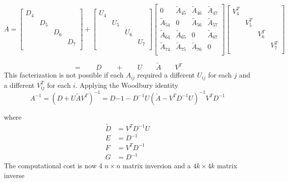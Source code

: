 \begin{equation*}
    A =
    \begin{bmatrix}
        D_4    & & & \\
        & D_5    & & \\
        & & D_6    & \\
        & & & D_7    \\
    \end{bmatrix}
    +
    \begin{bmatrix}
        U_4    & & & \\
        & U_5    & & \\
        & & U_6    & \\
        & & & U_7    \\
    \end{bmatrix}
    \begin{bmatrix}
        0    & \widetilde{A}_{45} & \widetilde{A}_{46} & \widetilde{A}_{47} \\
        \widetilde{A}_{54} & 0 & \widetilde{A}_{56} & \widetilde{A}_{57} \\
        \widetilde{A}_{64} & \widetilde{A}_{65} & 0 & \widetilde{A}_{67} \\
        \widetilde{A}_{74} & \widetilde{A}_{75} & \widetilde{A}_{76} &    0 \\
    \end{bmatrix}
    \begin{bmatrix}
        V^T_4    & & & \\
        & V^T_5    & & \\
        & & V^T_6    & \\
        & & & V^T_7    \\
    \end{bmatrix}
\end{equation*}
\begin{center}
    
\end{center}

\begin{equation*}
    = \qquad D \qquad + \qquad  U \qquad  \widetilde{A} \qquad V^T
\end{equation*}
This facterization is not possible if each $A_{ij}$ required a different $U_{ij}$ for each $j$ and a different $V^T_{ij}$ for each $i$. Applying the Woodbury identity
\begin{equation*}
    A^{-1} =
    \left(
    D + U \widetilde{A} V^T
    \right)^{-1}
    =
    D{-1} - D^{-1}U
    \left(
    \widetilde{A} - V^T D^{-1}U
    \right)^{-1}
    V^T D^{-1}
\end{equation*}
\begin{center}
    
\end{center}
where
\begin{align*}
    \widetilde{D} &= V^TD^{-1}U \\
    E &= D^{-1} \\
    F &= V^TD^{-1} \\
    G &= D^{-1}
\end{align*}
The computational cost is now 4 $n\times n$ matrix inversion and a $4k\times 4k$ matrix inverse


